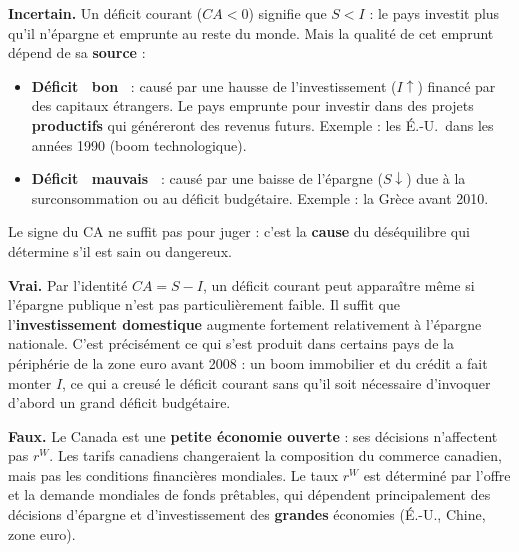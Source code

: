 
\begin{reponse}
\textbf{Incertain.} Un déficit courant ($CA < 0$) signifie que $S < I$ : le pays investit plus qu'il n'épargne et emprunte au reste du monde. Mais la qualité de cet emprunt dépend de sa \textbf{source} :
\begin{itemize}
   \item \textbf{Déficit \guillemotleft~bon~\guillemotright} : causé par une hausse de l'investissement ($I \uparrow$) financé par des capitaux étrangers. Le pays emprunte pour investir dans des projets \textbf{productifs} qui généreront des revenus futurs. Exemple : les É.-U.\ dans les années 1990 (boom technologique).
   \item \textbf{Déficit \guillemotleft~mauvais~\guillemotright} : causé par une baisse de l'épargne ($S \downarrow$) due à la surconsommation ou au déficit budgétaire. Exemple : la Grèce avant 2010.
\end{itemize}
Le signe du CA ne suffit pas pour juger : c'est la \textbf{cause} du déséquilibre qui détermine s'il est sain ou dangereux.
\end{reponse}


\begin{reponse}
\textbf{Vrai.} Par l'identité $CA = S - I$, un déficit courant peut apparaître même si l'épargne publique n'est pas particulièrement faible. Il suffit que l'\textbf{investissement domestique} augmente fortement relativement à l'épargne nationale. C'est précisément ce qui s'est produit dans certains pays de la périphérie de la zone euro avant 2008 : un boom immobilier et du crédit a fait monter $I$, ce qui a creusé le déficit courant sans qu'il soit nécessaire d'invoquer d'abord un grand déficit budgétaire.
\end{reponse}


\begin{reponse}
\textbf{Faux.} Le Canada est une \textbf{petite économie ouverte} : ses décisions n'affectent pas $r^W$. Les tarifs canadiens changeraient la composition du commerce canadien, mais pas les conditions financières mondiales. Le taux $r^W$ est déterminé par l'offre et la demande mondiales de fonds prêtables, qui dépendent principalement des décisions d'épargne et d'investissement des \textbf{grandes} économies (É.-U., Chine, zone euro).
\end{reponse}

